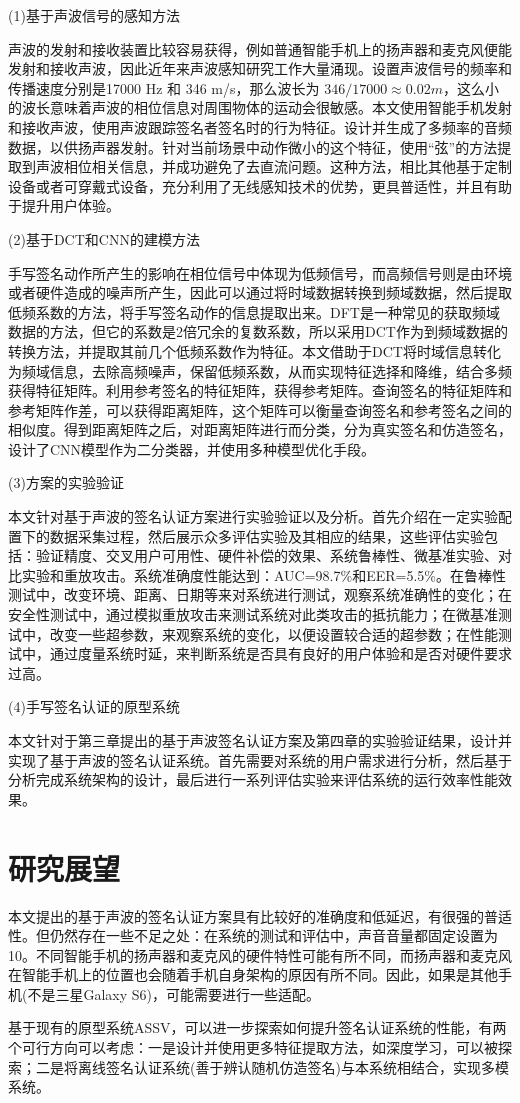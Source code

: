 (1)基于声波信号的感知方法

声波的发射和接收装置比较容易获得，例如普通智能手机上的扬声器和麦克风便能发射和接收声波，因此近年来声波感知研究工作大量涌现。设置声波信号的频率和传播速度分别是17000 Hz 和 346 m/s，那么波长为  $346/17000\approx0.02m$，这么小的波长意味着声波的相位信息对周围物体的运动会很敏感。本文使用智能手机发射和接收声波，使用声波跟踪签名者签名时的行为特征。设计并生成了多频率的音频数据，以供扬声器发射。针对当前场景中动作微小的这个特征，使用“弦”的方法提取到声波相位相关信息，并成功避免了去直流问题。这种方法，相比其他基于定制设备或者可穿戴式设备，充分利用了无线感知技术的优势，更具普适性，并且有助于提升用户体验。

(2)基于DCT和CNN的建模方法

手写签名动作所产生的影响在相位信号中体现为低频信号，而高频信号则是由环境或者硬件造成的噪声所产生，因此可以通过将时域数据转换到频域数据，然后提取低频系数的方法，将手写签名动作的信息提取出来。DFT是一种常见的获取频域数据的方法，但它的系数是2倍冗余的复数系数，所以采用DCT作为到频域数据的转换方法，并提取其前几个低频系数作为特征。本文借助于DCT将时域信息转化为频域信息，去除高频噪声，保留低频系数，从而实现特征选择和降维，结合多频获得特征矩阵。利用参考签名的特征矩阵，获得参考矩阵。查询签名的特征矩阵和参考矩阵作差，可以获得距离矩阵，这个矩阵可以衡量查询签名和参考签名之间的相似度。得到距离矩阵之后，对距离矩阵进行而分类，分为真实签名和仿造签名，设计了CNN模型作为二分类器，并使用多种模型优化手段。

(3)方案的实验验证

本文针对基于声波的签名认证方案进行实验验证以及分析。首先介绍在一定实验配置下的数据采集过程，然后展示众多评估实验及其相应的结果，这些评估实验包括：验证精度、交叉用户可用性、硬件补偿的效果、系统鲁棒性、微基准实验、对比实验和重放攻击。系统准确度性能达到：AUC=98.7\%和EER=5.5\%。在鲁棒性测试中，改变环境、距离、日期等来对系统进行测试，观察系统准确性的变化；在安全性测试中，通过模拟重放攻击来测试系统对此类攻击的抵抗能力；在微基准测试中，改变一些超参数，来观察系统的变化，以便设置较合适的超参数；在性能测试中，通过度量系统时延，来判断系统是否具有良好的用户体验和是否对硬件要求过高。

(4)手写签名认证的原型系统

本文针对于第三章提出的基于声波签名认证方案及第四章的实验验证结果，设计并实现了基于声波的签名认证系统。首先需要对系统的用户需求进行分析，然后基于分析完成系统架构的设计，最后进行一系列评估实验来评估系统的运行效率性能效果。

\section{研究展望}
本文提出的基于声波的签名认证方案具有比较好的准确度和低延迟，有很强的普适性。但仍然存在一些不足之处：在系统的测试和评估中，声音音量都固定设置为10。不同智能手机的扬声器和麦克风的硬件特性可能有所不同，而扬声器和麦克风在智能手机上的位置也会随着手机自身架构的原因有所不同。因此，如果是其他手机(不是三星Galaxy S6)，可能需要进行一些适配。

基于现有的原型系统ASSV，可以进一步探索如何提升签名认证系统的性能，有两个可行方向可以考虑：一是设计并使用更多特征提取方法，如深度学习，可以被探索；二是将离线签名认证系统(善于辨认随机仿造签名)与本系统相结合，实现多模系统。

